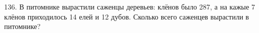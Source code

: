 136. В питомнике вырастили саженцы деревьев: клёнов было 287, а на кажые 7 клёнов приходилось 14 елей и 12 дубов. Сколько всего саженцев вырастили в питомнике?\\
